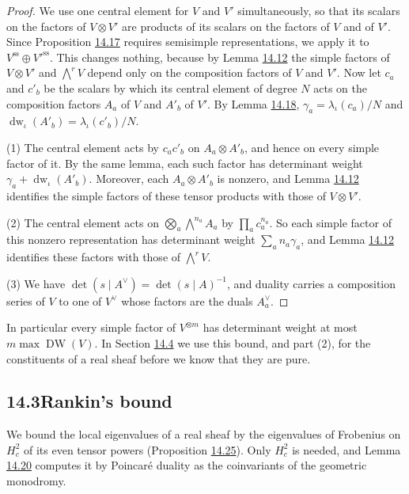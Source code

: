 \documentclass[11pt]{article}
\begin{document}
\begin{proof}[{Proof}]\label{bp62}%
We use one central element for \(V\) and \(V'\) simultaneously, so that its scalars on the factors of \(V\otimes V'\) are products of its scalars on the factors of \(V\) and of \(V'\). Since Proposition \hyperref[bp54]{14.17} requires semisimple representations, we apply it to \(V^{\mathrm{ss}}\oplus V'^{\mathrm{ss}}\). This changes nothing, because by Lemma \hyperref[bp40]{14.12} the simple factors of \(V\otimes V'\) and \(\bigwedge^rV\) depend only on the composition factors of \(V\) and \(V'\). Now let \(c_a\) and \(c'_b\) be the scalars by which its central element of degree \(N\) acts on the composition factors \(A_a\) of \(V\) and \(A'_b\) of \(V'\). By Lemma \hyperref[bp58]{14.18}, \(\gamma_a=\lambda_\iota(c_a)/N\) and \(\operatorname{dw}_\iota(A'_b)=\lambda_\iota(c'_b)/N\).

(1) The central element acts by \(c_ac'_b\) on \(A_a\otimes A'_b\), and hence on every simple factor of it. By the same lemma, each such factor has determinant weight \(\gamma_a+\operatorname{dw}_\iota(A'_b)\). Moreover, each \(A_a\otimes A'_b\) is nonzero, and Lemma \hyperref[bp40]{14.12} identifies the simple factors of these tensor products with those of \(V\otimes V'\).

(2) The central element acts on \(\bigotimes_a\bigwedge^{n_a}A_a\) by \(\prod_ac_a^{n_a}\). So each simple factor of this nonzero representation has determinant weight \(\sum_an_a\gamma_a\), and Lemma \hyperref[bp40]{14.12} identifies these factors with those of \(\bigwedge^rV\).

(3) We have \(\det(s\mid A^\vee)=\det(s\mid A)^{-1}\), and duality carries a composition series of \(V\) to one of \(V^\vee\) whose factors are the duals \(A_a^\vee\).
\end{proof}

\label{bp63}%
In particular every simple factor of \(V^{\otimes m}\) has determinant weight at most \(m\max\operatorname{DW}(V)\). In Section \hyperref[bp80]{14.4} we use this bound, and part (2), for the constituents of a real sheaf before we know that they are pure.



\subsection*{\texorpdfstring{14.3\quad Rankin's bound}{14.3 Rankin's bound}}
\label{bp64}%
\label{bp65}%
We bound the local eigenvalues of a real sheaf by the eigenvalues of Frobenius on \(H^2_c\) of its even tensor powers (Proposition \hyperref[bp78]{14.25}). Only \(H^2_c\) is needed, and Lemma \hyperref[bp66]{14.20} computes it by Poincaré duality as the coinvariants of the geometric monodromy.
\end{document}
